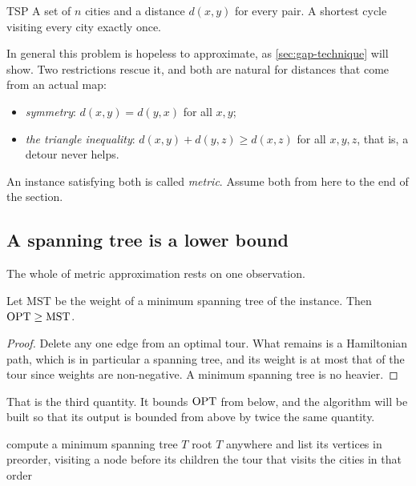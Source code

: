 \begin{probdef}{TSP}
  \instance A set of $n$ cities and a distance $d(x,y)$ for every pair.
  \question A shortest cycle visiting every city exactly once.
\end{probdef}

In general this problem is hopeless to approximate, as \cref{sec:gap-technique}
will show. Two restrictions rescue it, and both are natural for distances that
come from an actual map:
\begin{itemize}[nosep,leftmargin=*]
  \item \emph{symmetry}: $d(x,y) = d(y,x)$ for all $x,y$;
  \item \emph{the triangle inequality}: $d(x,y) + d(y,z) \ge d(x,z)$ for all
        $x,y,z$, that is, a detour never helps.
\end{itemize}
An instance satisfying both is called \emph{metric}. Assume both from here to
the end of the section.

\subsection{A spanning tree is a lower bound}

The whole of metric  approximation rests on one observation.

\begin{lemma}\label{lem:tsp-mst-lower-bound}
Let $\mathrm{MST}$ be the weight of a minimum spanning tree of the instance.
Then $\mathrm{OPT} \ge \mathrm{MST}$.
\end{lemma}

\begin{proof}
Delete any one edge from an optimal tour. What remains is a Hamiltonian path,
which is in particular a spanning tree, and its weight is at most that of the
tour since weights are non-negative. A minimum spanning tree is no heavier.
\end{proof}

That is the third quantity. It bounds $\mathrm{OPT}$ from below, and the algorithm will
be built so that its output is bounded from above by twice the same quantity.

\begin{algorithm}[ht]
\caption{Double-tree $2$-approximation for metric }
\label{alg:tsp-double-tree}
\begin{algorithmic}[1]
  \State compute a minimum spanning tree $T$
  \State root $T$ anywhere and list its vertices in preorder, visiting a node
         before its children
  \State \Return the tour that visits the cities in that order
\end{algorithmic}
\end{algorithm}

